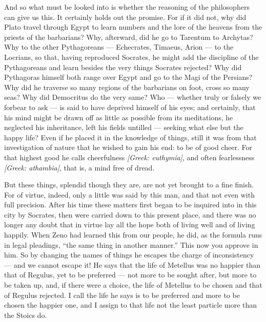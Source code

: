  And so what must be looked into is whether the reasoning of the philosophers can give us this. It certainly holds out the promise. For if it did not, why did Plato travel through Egypt to learn numbers and the lore of the heavens from the priests of the barbarians? Why, afterward, did he go to Tarentum to Archytas? Why to the other Pythagoreans — Echecrates, Timaeus, Arion — to the Locrians, so that, having reproduced Socrates, he might add the discipline of the Pythagoreans and learn besides the very things Socrates rejected? Why did Pythagoras himself both range over Egypt and go to the Magi of the Persians? Why did he traverse so many regions of the barbarians on foot, cross so many seas? Why did Democritus do the very same? Who — whether truly or falsely we forbear to ask — is said to have deprived himself of his eyes; and certainly, that his mind might be drawn off as little as possible from its meditations, he neglected his inheritance, left his fields untilled — seeking what else but the happy life? Even if he placed it in the knowledge of things, still it was from that investigation of nature that he wished to gain his end: to be of good cheer. For that highest good he calls cheerfulness \textit{[Greek: euthymia]}, and often fearlessness \textit{[Greek: athambia]}, that is, a mind free of dread.

 But these things, splendid though they are, are not yet brought to a fine finish. For of virtue, indeed, only a little was said by this man, and that not even with full precision. After his time these matters first began to be inquired into in this city by Socrates, then were carried down to this present place, and there was no longer any doubt that in virtue lay all the hope both of living well and of living happily. When Zeno had learned this from our people, he did, as the formula runs in legal pleadings, “the same thing in another manner.” This now you approve in him. So by changing the names of things he escapes the charge of inconsistency — and we cannot escape it! He says that the life of Metellus was no happier than that of Regulus, yet to be preferred — not more to be sought after, but more to be taken up, and, if there were a choice, the life of Metellus to be chosen and that of Regulus rejected. I call the life he says is to be preferred and more to be chosen the happier one, and I assign to that life not the least particle more than the Stoics do.

